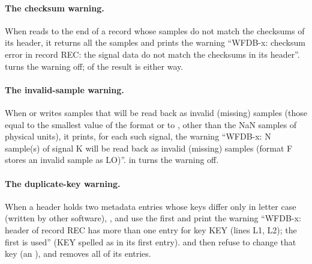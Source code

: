 \paragraph{The checksum warning.} When  reads to the end of a record
whose samples do not match the checksums of its header, it returns all the samples and
prints the warning ``WFDB-x: checksum error in record REC: the signal data do not match
the checksums in its header''.  turns the warning off;
 of the result is  either way.

\paragraph{The invalid-sample warning.} When  or
 writes samples that will be read back as invalid
(missing) samples (those equal to the smallest value of the format or to
, other than the NaN samples of physical units), it prints,
for each such signal, the warning ``WFDB-x: N sample(s) of signal K will be read back as
invalid (missing) samples (format F stores an invalid sample as LO)''.
 in  turns the warning off.

\paragraph{The duplicate-key warning.} When a header holds two metadata entries whose keys
differ only in letter case (written by other software), ,
 and  use the first and print the warning ``WFDB-x:
header of record REC has more than one entry for key KEY (lines L1, L2); the first is
used'' (KEY spelled as in its first entry).  and
 then refuse to change that key (an ), and
 removes all of its entries.

